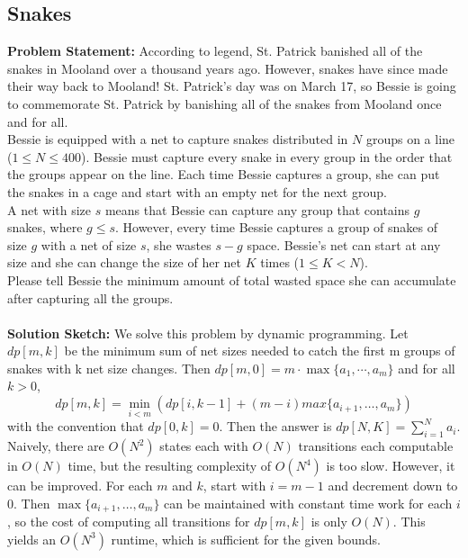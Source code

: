\documentclass{article}
\begin{document}
\subsection{Snakes}
\textbf{Problem Statement:}
According to legend, St. Patrick banished all of the snakes in Mooland over a thousand years ago. However, snakes have since made their way back to Mooland! St. Patrick’s day was on March 17, so Bessie is going to commemorate St. Patrick by banishing all of the snakes from Mooland once and for all.\\ Bessie is equipped with a net to capture snakes distributed in $N$ groups on a line ($1\leq N \leq 400$). Bessie must capture every snake in every group in the order that the groups appear on the line. Each time Bessie captures a group, she can put the snakes in a cage and start with an empty net for the next group. \\ A net with size $s$ means that Bessie can capture any group that contains $g$ snakes, where $g \leq s$. However, every time Bessie captures a group of snakes of size $g$ with a net of size $s$, she wastes $s−g$ space. Bessie’s net can start at any size and she can change the size of her net $K$ times ($1 \leq K < N$). \\ Please tell Bessie the minimum amount of total wasted space she can accumulate after capturing all the groups. \\\\
\textbf{Solution Sketch:}
We solve this problem by dynamic programming. Let $dp[m,k]$ be the minimum sum of net sizes needed to catch the first m groups of snakes with k net size changes. Then $dp[m,0]=m\cdot \max\{a_1,\cdots,a_m\}$ and for all $k>0$, $$dp[m,k]=\min_{i<m}(dp[i,k−1]+(m−i)max\{a_{i+1},…,a_m\})$$
with the convention that $dp[0,k]=0$. Then the answer is $dp[N,K] = \sum^N_{i=1} a_i.$
Naively, there are $O(N^2)$ states each with $O(N)$ transitions each computable in $O(N)$ time, but the resulting complexity of $O(N^4)$ is too slow. However, it can be improved. For each $m$ and $k$, start with $i=m−1$ and decrement down to $0$. Then $\max\{a_{i+1},…,a_m\}$ can be maintained with constant time work for each $i$, so the cost of computing all transitions for $dp[m,k]$ is only $O(N)$. This yields an $O(N^3)$ runtime, which is sufficient for the given bounds.
\end{document}
